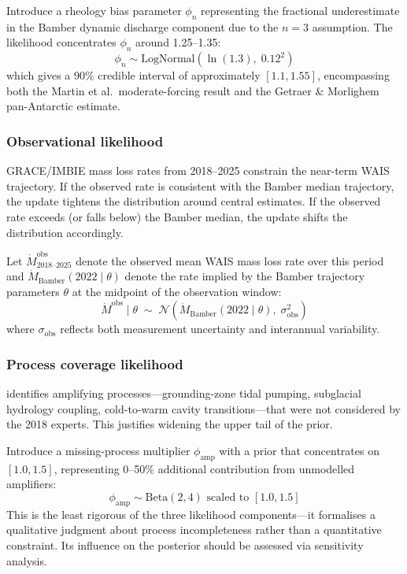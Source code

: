 \documentclass[11pt]{article}
\begin{document}
Introduce a rheology bias parameter $\phi_n$ representing the fractional underestimate in the Bamber dynamic discharge component due to the $n = 3$ assumption.  The likelihood concentrates $\phi_n$ around 1.25--1.35:
\begin{equation}
  \phi_n \sim \text{LogNormal}\!\left(\ln(1.3),\; 0.12^2\right)
  \label{eq:rheology_likelihood}
\end{equation}
which gives a 90\% credible interval of approximately $[1.1, 1.55]$, encompassing both the Martin et al.\ moderate-forcing result and the Getraer \& Morlighem pan-Antarctic estimate.

\subsubsection{Observational likelihood}

GRACE/IMBIE mass loss rates from 2018--2025 constrain the near-term WAIS trajectory.  If the observed rate is consistent with the Bamber median trajectory, the update tightens the distribution around central estimates.  If the observed rate exceeds (or falls below) the Bamber median, the update shifts the distribution accordingly.

Let $\dot{M}^{\text{obs}}_{2018\text{--}2025}$ denote the observed mean WAIS mass loss rate over this period and $\dot{M}_{\text{Bamber}}(2022 \mid \theta)$ denote the rate implied by the Bamber trajectory parameters $\theta$ at the midpoint of the observation window:
\begin{equation}
  \dot{M}^{\text{obs}} \mid \theta \;\sim\; \mathcal{N}\!\left(\dot{M}_{\text{Bamber}}(2022 \mid \theta),\; \sigma^2_{\text{obs}}\right)
  \label{eq:obs_likelihood}
\end{equation}
where $\sigma_{\text{obs}}$ reflects both measurement uncertainty and interannual variability.

\subsubsection{Process coverage likelihood}

\citet{fricker2025antarctica} identifies amplifying processes---grounding-zone tidal pumping, subglacial hydrology coupling, cold-to-warm cavity transitions---that were not considered by the 2018 experts.  This justifies widening the upper tail of the prior.

Introduce a missing-process multiplier $\phi_{\text{amp}}$ with a prior that concentrates on $[1.0, 1.5]$, representing 0--50\% additional contribution from unmodelled amplifiers:
\begin{equation}
  \phi_{\text{amp}} \sim \text{Beta}(2, 4) \text{ scaled to } [1.0, 1.5]
  \label{eq:process_likelihood}
\end{equation}
This is the least rigorous of the three likelihood components---it formalises a qualitative judgment about process incompleteness rather than a quantitative constraint.  Its influence on the posterior should be assessed via sensitivity analysis.
\end{document}

